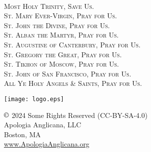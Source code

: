 \checkoddpage
\ifoddpage \thispagestyle{empty}
~\clearpage\fi
\fancyhead[RE,LO]{}\fancyhead[RO,LE]{}\fancyhead[C]{}\thispagestyle{empty}
   \begin{center}
   	{\scshape
   	{\large Most Holy Trinity, Save Us.}\\
   	
   	St. Mary Ever-Virgin, Pray for Us.\\
   	St. John the Divine, Pray for Us.\\
   	St. Alban the Martyr, Pray for Us.\\
   	St. Augustine of Canterbury, Pray for Us.\\
    St. Gregory the Great, Pray for Us.\\
    St. Tikhon of Moscow, Pray for Us.\\
    St. John of San Francisco, Pray for Us.\\
   	All Ye Holy Angels \& Saints, Pray for Us.}
   	\vfill
   	
   	\texttt{[image: logo.eps]}
			\par
	$\copyright$ 2024 Some Rights Reserved (CC-BY-SA-4.0)\\
	Apologia Anglicana, LLC\\
    Boston, MA\\
	\url{www.ApologiaAnglicana.org}
   \end{center}
